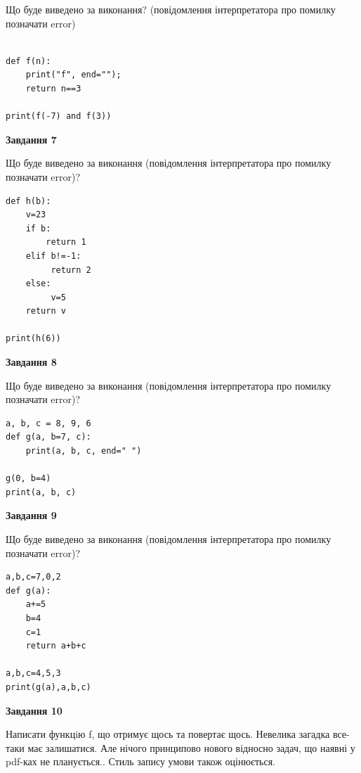 \documentclass[12pt, ukrainian]{article}
\begin{document}
{\begin {large}
Що буде виведено за виконання? (повідомлення інтерпретатора про помилку позначати error)\par
\begin{verbatim}

def f(n):
    print("f", end="");
    return n==3

print(f(-7) and f(3))
\end{verbatim}

{\begin {center}\textbf{Завдання 7}\end {center}}

Що буде виведено за виконання (повідомлення інтерпретатора про помилку позначати error)?\par
\begin{verbatim}
def h(b):
    v=23
    if b: 
        return 1
    elif b!=-1:
         return 2
    else:
         v=5
    return v

print(h(6))
\end{verbatim}

{\begin {center}\textbf{Завдання 8}\end {center}}

Що буде виведено за виконання (повідомлення інтерпретатора про помилку позначати error)?\par
\begin{verbatim}
a, b, c = 8, 9, 6
def g(a, b=7, c):
    print(a, b, c, end=" ")

g(0, b=4)
print(a, b, c)
\end{verbatim}

{\begin {center}\textbf{Завдання 9}\end {center}}

Що буде виведено за виконання (повідомлення інтерпретатора про помилку позначати error)?\par
\begin{verbatim}
a,b,c=7,0,2
def g(a):
    a+=5
    b=4
    c=1
    return a+b+c

a,b,c=4,5,3
print(g(a),a,b,c)
\end{verbatim}

{\begin {center}\textbf{Завдання 10}\end {center}}


Написати функцiю f, що отримує щось та повертає щось. Невелика загадка все-таки має залишатися. Але нічого принципово нового відносно задач, що наявні у pdf-ках не планується.. Стиль запису умови також оцінюється.\par
\end {large}}
\newpage
\end{document}
